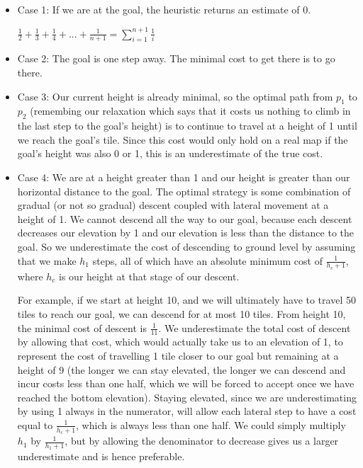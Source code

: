 \documentclass[11pt]{article}  %
\begin{document}
\begin{itemize}
\item Case 1: If we are at the goal, the heuristic returns an estimate of 0.
\begin{center}
$\frac{1}{2}+\frac{1}{3}+\frac{1}{4}+ ... +\frac{1}{n+1} = \sum_{i=1}^{n+1}\frac{1}{i}$
\end{center}
\item Case 2: The goal is one step away. The minimal cost to get there is to go there.
\item Case 3: Our current height is already minimal, so the optimal path from $p_1$ to $p_2$ (remembing our relaxation which says that it costs us nothing to climb in the last step to the goal's height) is to continue to travel at a height of 1 until we reach the goal's tile. Since this cost would only hold on a real map if the goal's height was also 0 or 1, this is an underestimate of the true cost.
\item Case 4: We are at a height greater than 1 and our height is greater than our horizontal distance to the goal. The optimal strategy is some combination of gradual (or not so gradual) descent coupled with lateral movement at a height of 1. We cannot descend all the way to our goal, because each descent decreases our elevation by 1 and our elevation is less than the distance to the goal. So we underestimate the cost of descending to ground level by assuming that we make $h_1$ steps, all of which have an absolute minimum cost of $\frac{1}{h_c+1}$, where $h_c$ is our height at that stage of our descent.

For example, if we start at height 10, and we will ultimately have to travel 50 tiles to reach our goal, we can descend for at most 10 tiles. From height 10, the minimal cost of descent is $\frac{1}{11}$. We underestimate the total cost of descent by allowing that cost, which would actually take us to an elevation of 1, to represent the cost of travelling 1 tile closer to our goal but remaining at a height of 9 (the longer we can stay elevated, the longer we can descend and incur costs less than one half, which we will be forced to accept once we have reached the bottom elevation). Staying elevated, since we are underestimating by using 1 always in the numerator, will allow each lateral step to have a cost equal to $\frac{1}{h_c+1}$, which is always less than one half. We could simply multiply $h_1$ by $\frac{1}{h_1+1}$, but by allowing the denominator to decrease gives us a larger underestimate and is hence preferable.


\end{itemize}
\end{document}
